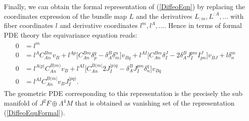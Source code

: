 Finally, we can obtain the formal representation of (\ref{DiffeoEqn}) by replacing the coordinates expression of the bundle map $L$ and the derivatives $L_{:m},L^{:A},...$ with fiber coordinates $l$ and derivative coordinates $l^m,l^A,...$. Hence in terms of formal PDE theory the equivariance equation reads:
\begin{align}\label{DiffeoEqnFormal}
\begin{aligned}
    0 &= l^{m} \\
    0 &= l^{A} C_{An}^{Bm} v_B + l^{Ap} \bigl[ C_{An}^{Bm} \delta_p^q - \delta_A^B \delta_m^n \bigr] v_{Bq} + l^{AI} \bigl[ C_{An}^{Bm} \delta_I^J - 2 \delta_A^B J_I^{pm} I^J_{pn}  \bigr] v_{BJ} + l \delta^m_n \\
    0 &= l^{A(p\vert}C_{An}^{B \vert m)} v_B + l^{ AI} \bigl[ C_{An}^{B(m\vert} 2 J_I^{\vert p) q} - \delta^B_A J_I ^{pm} \delta_n^q \bigr] v_{Bq} \\
    0 &= l^{AI} C_{An}^{B(m\vert} v_B J_I^{\vert p q )}.
    \end{aligned}
\end{align}
The geometric PDE corresponding to this representation is the precisely the sub manifold of $J^2F\oplus \Lambda^4M$ that is obtained as vanishing set of the representation (\ref{DiffeoEqnFormal}).

